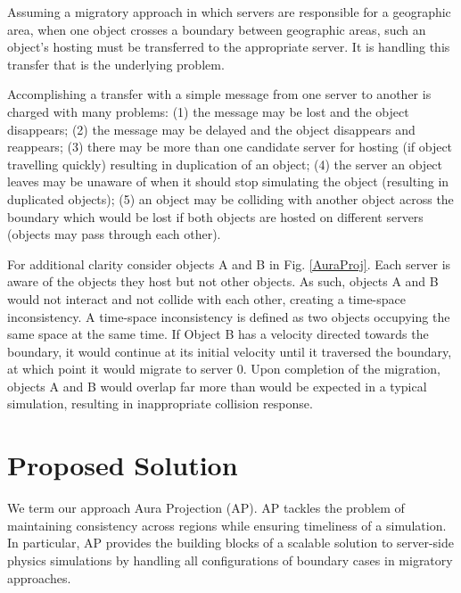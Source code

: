 Assuming a migratory approach in which servers are responsible for a geographic area, when one object crosses a boundary between geographic areas, such an object's hosting must be transferred to the appropriate server. It is handling this transfer that is the underlying problem.

Accomplishing a transfer with a simple message from one server to another is charged with many problems: (1) the message may be lost and the object disappears; (2) the message may be delayed and the object disappears and reappears; (3) there may be more than one candidate server for hosting (if object travelling quickly) resulting in duplication of an object; (4) the server an object leaves may be unaware of when it should stop simulating the object (resulting in duplicated objects)\cite{High-performanceServerSystems}; (5) an object may be colliding with another object across the boundary which would be lost if both objects are hosted on different servers (objects may pass through each other).

For additional clarity consider objects A and B in Fig. \ref{AuraProj}. Each server is aware of the objects they host but not other objects. As such, objects A and B would not interact and not collide with each other, creating a time-space inconsistency. A time-space inconsistency is defined as two objects occupying the same space at the same time. If Object B has a velocity directed towards the boundary, it would continue at its initial velocity until it traversed the boundary, at which point it would migrate to server 0. Upon completion of the migration, objects A and B would overlap far more than would be expected in a typical simulation, resulting in inappropriate collision response.

\section{Proposed Solution}
We term our approach Aura Projection (AP). AP tackles the problem of maintaining consistency across regions while ensuring timeliness of a simulation. In particular, AP provides the building blocks of a scalable solution to server-side physics simulations by handling all configurations of boundary cases in migratory approaches. 

